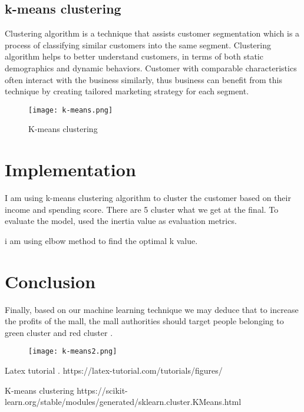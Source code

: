 \documentclass[conference]{IEEEtran}
\begin{document}
\subsection{k-means clustering}
Clustering algorithm is a technique that assists customer segmentation which is a process of classifying similar customers into the same segment. Clustering algorithm helps to better understand customers, in terms of both static demographics and dynamic behaviors. Customer with comparable characteristics often interact with the business similarly, thus business can benefit from this technique by creating tailored marketing strategy for each segment.
\begin{figure}[h!]
  \texttt{[image: k-means.png]}
  \caption{K-means clustering}
  \label{fig 2}
\end{figure}
\section{\bf \large Implementation}
I am using k-means clustering algorithm to cluster the customer based on their income and spending score. There are 5 cluster what we get at the final. To evaluate the model, used the inertia value as evaluation metrics.
\par i am using elbow method to find the optimal k value.
\section{\bf Conclusion}
Finally, based on our machine learning technique we may deduce that to increase the profits of the mall, the mall authorities should target people belonging to green cluster and red cluster .
\begin{figure}[h!]
  \texttt{[image: k-means2.png]}
  \caption{}
  \label{fig 3}
\end{figure}
\newpage
\begin{thebibliography}{99}

\bibitem   {}  Latex tutorial . https://latex-tutorial.com/tutorials/figures/

\bibitem {} K-means clustering https://scikit-learn.org/stable/modules/generated/sklearn.cluster.KMeans.html

\end{thebibliography}
\end{document}
